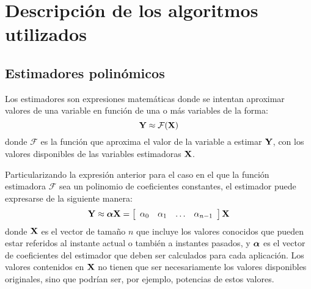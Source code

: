 
\section{Descripción de los algoritmos utilizados}
\label{ch:algoritmos}



\subsection{Estimadores polinómicos}

Los estimadores son expresiones matemáticas donde se intentan aproximar valores de una variable en función de una o más variables de la forma:
%
\begin{equation}
    \estimated \approx \mathcal{F}(\estimation)
\end{equation}
%
donde $\mathcal{F}$ es la función que aproxima el valor de la variable a estimar $\estimated$, con los valores disponibles de las variables estimadoras $\estimation$.

Particularizando la expresión anterior para el caso en el que la función estimadora $\mathcal{F}$ sea un polinomio de coeficientes constantes, el estimador puede expresarse de la siguiente manera:
%
\begin{equation}
    \estimated \approx \coefficients \estimation = \sqbr{\hvect{cccc}{\coefficient_0 & \coefficient_1 & \hdots & \coefficient_{n-1}}} \estimation
\end{equation}
%
donde $\estimation$ es el vector de tamaño $n$ que incluye los valores conocidos que pueden estar referidos al instante actual o también a instantes pasados, y $\coefficients$ es el vector de coeficientes del estimador que deben ser calculados para cada aplicación. Los valores contenidos en $\estimation$ no tienen que ser necesariamente los valores disponibles originales, sino que podrían ser, por ejemplo, potencias de estos valores.

